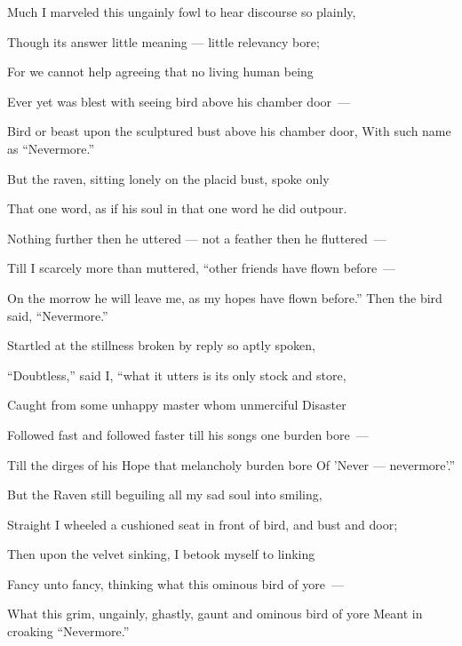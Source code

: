 \documentclass[openany]{book} %
\begin{document}
\bigskip
\par\noindent Much I marveled this ungainly fowl to hear discourse so plainly,
\par\noindent Though its answer little meaning — little relevancy bore;
\par\noindent For we cannot help agreeing that no living human being
\par\noindent Ever yet was blest with seeing bird above his chamber door~—
\par\noindent Bird or beast upon the sculptured bust above his chamber door,
     With such name as “Nevermore.”

\bigskip
\par\noindent But the raven, sitting lonely on the placid bust, spoke only
\par\noindent That one word, as if his soul in that one word he did outpour.
\par\noindent Nothing further then he uttered — not a feather then he fluttered~—
\par\noindent Till I scarcely more than muttered, “other friends have flown before~—
\par\noindent On the morrow he will leave me, as my hopes have flown before.”
     Then the bird said, “Nevermore.”

\bigskip
\par\noindent Startled at the stillness broken by reply so aptly spoken,
\par\noindent “Doubtless,” said I, “what it utters is its only stock and store,
\par\noindent Caught from some unhappy master whom unmerciful Disaster
\par\noindent Followed fast and followed faster till his songs one burden bore~—
\par\noindent Till the dirges of his Hope that melancholy burden bore
     Of ’Never — nevermore’.”

\bigskip
\par\noindent But the Raven still beguiling all my sad soul into smiling,
\par\noindent Straight I wheeled a cushioned seat in front of bird, and bust and door;
\par\noindent Then upon the velvet sinking, I betook myself to linking
\par\noindent Fancy unto fancy, thinking what this ominous bird of yore~—
\par\noindent What this grim, ungainly, ghastly, gaunt and ominous bird of yore
     Meant in croaking “Nevermore.”
\end{document}
